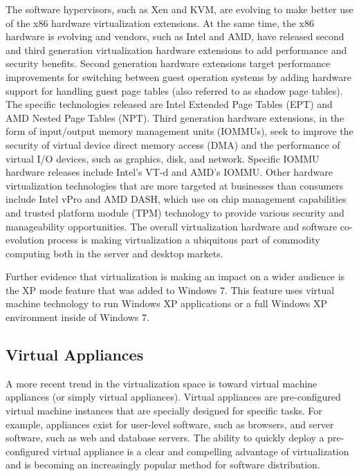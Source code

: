 The software hypervisors, such as Xen and KVM, are evolving to make better use of the x86 hardware virtualization extensions. At the same time, the x86 hardware is evolving and vendors, such as Intel and AMD, have released second and third generation virtualization hardware extensions to add performance and security benefits. Second generation hardware extensions target performance improvements for switching between guest operation systems by adding hardware support for handling guest page tables (also referred to as shadow page tables). The specific technologies released are Intel Extended Page Tables (EPT) and AMD Nested Page Tables (NPT). Third generation hardware extensions, in the form of input/output memory management units (IOMMUs), seek to improve the security of virtual device direct memory access (DMA) and the performance of virtual I/O devices, such as graphics, disk, and network. Specific IOMMU hardware releases include Intel's VT-d and AMD's IOMMU. Other hardware virtualization technologies that are more targeted at businesses than consumers include Intel vPro and AMD DASH, which use on chip management capabilities and trusted platform module (TPM) technology to provide various security and manageability opportunities. The overall virtualization hardware and software co-evolution process is making virtualization a ubiquitous part of commodity computing both in the server and desktop markets. 

Further evidence that virtualization is making an impact on a wider audience is the XP mode feature that was added to Windows 7. This feature uses virtual machine technology to run Windows XP applications or a full Windows XP environment inside of Windows 7\cite{windows_xp_mode}. 

\subsection{Virtual Appliances}
\label{VirtualAppliances}

A more recent trend in the virtualization space is toward virtual machine appliances (or simply virtual appliances). Virtual appliances are pre-configured virtual machine instances that are specially designed for specific tasks. For example, appliances exist for user-level software, such as browsers, and server software, such as web and database servers. The ability to quickly deploy a pre-configured virtual appliance is a clear and compelling advantage of virtualization and is becoming an increasingly popular method for software distribution.

